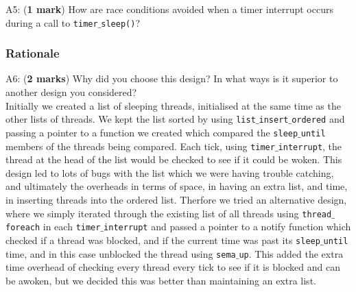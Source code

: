 \documentclass[a4paper,12pt]{article}
\begin{document}
A5: ({\bf 1 mark}) How are race conditions avoided when a timer interrupt occurs during a call to \texttt{timer$\_$sleep()}? \\

\subsubsection*{Rationale}
A6: ({\bf 2 marks}) Why did you choose this design?
In what ways is it superior to another design you considered? \\

Initially we created a list of sleeping threads, initialised at the same time as the other lists of threads. We kept the list sorted by using \texttt{list$\_$insert$\_$ordered} and passing a pointer to a function we created which compared the \texttt{sleep$\_$until} members of the threads being compared. Each tick, using \texttt{timer$\_$interrupt}, the thread at the head of the list would be checked to see if it could be woken. This design led to lots of bugs with the list which we were having trouble catching, and ultimately the overheads in terms of space, in having an extra list, and time, in inserting threads into the ordered list. Therfore we tried an alternative design, where we simply iterated through the existing list of all threads using \texttt{thread$\_$foreach} in each \texttt{timer$\_$interrupt} and passed a pointer to a notify function which checked if a thread was blocked, and if the current time was past its \texttt{sleep$\_$until} time, and in this case unblocked the thread using \texttt{sema$\_$up}. This added the extra time overhead of checking every thread every tick to see if it is blocked and can be awoken, but we decided this was better than maintaining an extra list.
\end{document}
